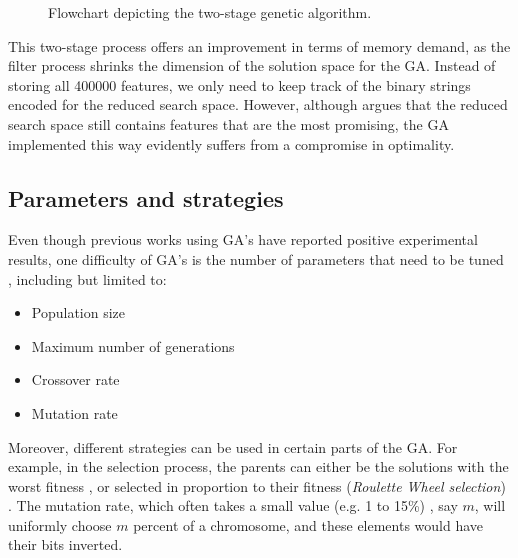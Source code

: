 \documentclass[12pt, twoside, a4paper]{report}
\begin{document}
\begin{figure}
\centering
{}
\caption{Flowchart depicting the two-stage genetic algorithm.}
\label{bg:fs:ga:twoStage}
\end{figure}

This two-stage process offers an improvement in terms of memory demand, as the filter process shrinks the dimension of the solution space for the GA. Instead of storing all 400000 features, we only need to keep track of the binary strings encoded for the reduced search space. However, although \cite{RefWorks:201} argues that the reduced search space still contains features that are the most promising, the GA implemented this way evidently suffers from a compromise in optimality.

\subsection{Parameters and strategies}
Even though previous works using GA's have reported positive experimental results, one difficulty of GA's is the number of parameters that need to be tuned \cite{RefWorks:210}, including but limited to:
\begin{itemize}
  \item Population size
  \item Maximum number of generations
  \item Crossover rate
  \item Mutation rate
\end{itemize}

Moreover, different strategies can be used in certain parts of the GA. For example, in the selection process, the parents can either be the solutions with the worst fitness \cite{RefWorks:203}, or selected in proportion to their fitness (\textit{Roulette Wheel selection}) \cite{RefWorks:205, RefWorks:227}. The mutation rate, which often takes a small value (e.g. 1 to 15\%) \cite{RefWorks:206}, say $m$, will uniformly choose $m$ percent of a chromosome, and these elements would have their bits inverted.
\end{document}
